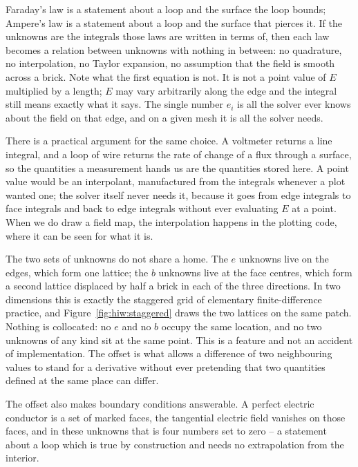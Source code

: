 Faraday's law is a statement about a loop and the surface the loop bounds; Ampere's law is a statement about a
loop and the surface that pierces it. If the unknowns are the integrals those laws are written in terms of,
then each law becomes a relation between unknowns with nothing in between: no quadrature, no interpolation, no
Taylor expansion, no assumption that the field is smooth across a brick. Note what the first equation is not. It
is not a point value of $E$ multiplied by a length; $E$ may vary arbitrarily along the edge and the integral
still means exactly what it says. The single number $e_i$ is all the solver ever knows about the field on that
edge, and on a given mesh it is all the solver needs.

There is a practical argument for the same choice. A voltmeter returns a line integral, and a loop of wire
returns the rate of change of a flux through a surface, so the quantities a measurement hands us are the
quantities stored here. A point value would be an interpolant, manufactured from the integrals whenever a plot
wanted one; the solver itself never needs it, because it goes from edge integrals to face integrals and back to
edge integrals without ever evaluating $E$ at a point. When we do draw a field map, the interpolation happens in
the plotting code, where it can be seen for what it is.

The two sets of unknowns do not share a home. The $e$ unknowns live on the edges, which form one lattice; the
$b$ unknowns live at the face centres, which form a second lattice displaced by half a brick in each of the
three directions. In two dimensions this is exactly the staggered grid of elementary finite-difference practice,
and Figure~\ref{fig:hiw:staggered} draws the two lattices on the same patch. Nothing is collocated: no $e$ and
no $b$ occupy the same location, and no two unknowns of any kind sit at the same point. This is a feature and
not an accident of implementation. The offset is what allows a difference of two neighbouring values to stand
for a derivative without ever pretending that two quantities defined at the same place can differ.

The offset also makes boundary conditions answerable. A perfect electric conductor is a set of marked faces, the
tangential electric field vanishes on those faces, and in these unknowns that is four numbers set to zero -- a
statement about a loop which is true by construction and needs no extrapolation from the interior.


